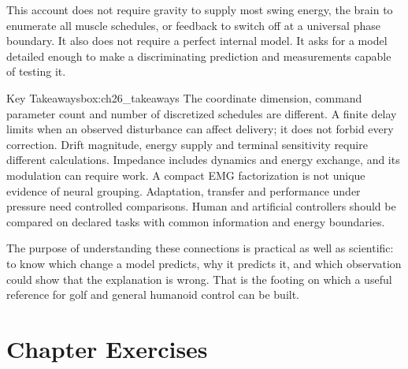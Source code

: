 This account does not require gravity to supply most swing energy, the brain to enumerate all muscle schedules, or feedback to switch off at a universal phase boundary. It also does not require a perfect internal model. It asks for a model detailed enough to make a discriminating prediction and measurements capable of testing it.

\begin{principle}{Key Takeaways}{box:ch26_takeaways}
The coordinate dimension, command parameter count and number of discretized schedules are different. A finite delay limits when an observed disturbance can affect delivery; it does not forbid every correction. Drift magnitude, energy supply and terminal sensitivity require different calculations. Impedance includes dynamics and energy exchange, and its modulation can require work. A compact EMG factorization is not unique evidence of neural grouping. Adaptation, transfer and performance under pressure need controlled comparisons. Human and artificial controllers should be compared on declared tasks with common information and energy boundaries.
\end{principle}

The purpose of understanding these connections is practical as well as scientific: to know which change a model predicts, why it predicts it, and which observation could show that the explanation is wrong. That is the footing on which a useful reference for golf and general humanoid control can be built.

\section{Chapter Exercises}
\label{ex:ch26_exercises}
\label{exercises:ex:ch26_exercises}

